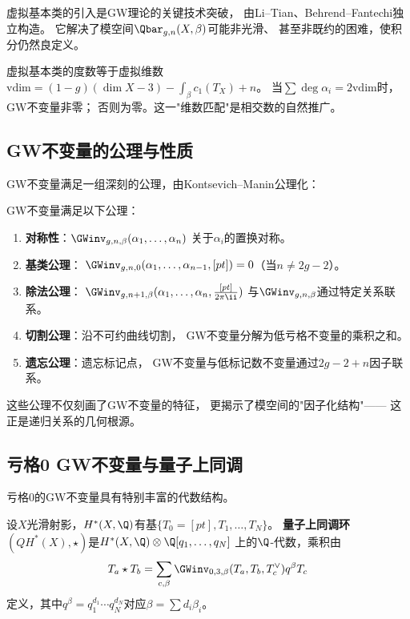 虚拟基本类的引入是GW理论的关键技术突破，
由Li--Tian、Behrend--Fantechi独立构造\cite{BF1997}。
它解决了模空间$\Qbar_{g,n}(X,\beta)$可能非光滑、
甚至非既约的困难，使积分仍然良定义。

\begin{remark}[虚拟维数]\label{rmk:virtdim}
虚拟基本类的度数等于虚拟维数
$\mathrm{vdim} = (1-g)(\dim X - 3) - \int_\beta c_1(T_X) + n$。
当$\sum \deg \alpha_i = 2\mathrm{vdim}$时，GW不变量非零；
否则为零。这一"维数匹配"是相交数的自然推广。
\end{remark}

\subsection{GW不变量的公理与性质}

GW不变量满足一组深刻的公理，由Kontsevich--Manin公理化\cite{KM1994}：

\begin{theorem}[GW公理]\label{thm:gwaxiom}
GW不变量满足以下公理：
\begin{enumerate}[label=(\textbf{A\arabic*})]
\item \textbf{对称性}：$\GWinv_{g,n,\beta}(\alpha_1, \ldots, \alpha_n)$
关于$\alpha_i$的置换对称。
\item \textbf{基类公理}：
$\GWinv_{g,n,0}(\alpha_1, \ldots, \alpha_{n-1}, [pt]) = 0$（当$n \neq 2g-2$）。
\item \textbf{除法公理}：
$\GWinv_{g,n+1,\beta}(\alpha_1, \ldots, \alpha_n, \frac{[pt]}{2\pi\ii})$
与$\GWinv_{g,n,\beta}$通过特定关系联系。
\item \textbf{切割公理}：沿不可约曲线切割，
GW不变量分解为低亏格不变量的乘积之和。
\item \textbf{遗忘公理}：遗忘标记点，
GW不变量与低标记数不变量通过$2g-2+n$因子联系。
\end{enumerate}
\end{theorem}

这些公理不仅刻画了GW不变量的特征，
更揭示了模空间的"因子化结构"——
这正是递归关系的几何根源。

\subsection{亏格0 GW不变量与量子上同调}

亏格0的GW不变量具有特别丰富的代数结构。

\begin{definition}[量子上同调环]\label{def:qcoh}
设$X$光滑射影，$H^*(X, \Q)$有基$\{T_0=[pt], T_1, \ldots, T_N\}$。
\textbf{量子上同调环}$(QH^*(X), \star)$是$H^*(X, \Q) \otimes \Q[q_1, \ldots, q_N]$
上的$\Q$-代数，乘积由
\[
T_a \star T_b = \sum_{c, \beta} \GWinv_{0,3,\beta}(T_a, T_b, T_c^\vee) q^\beta T_c
\]
定义，其中$q^\beta = q_1^{d_1} \cdots q_N^{d_N}$对应$\beta = \sum d_i \beta_i$。
\end{definition}

